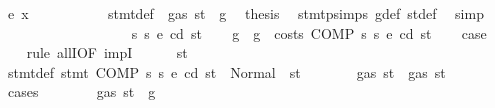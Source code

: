 \begin{isabellebody}
\ {\isacharparenleft}{\kern0pt}e\ x{\isacharparenright}{\kern0pt}\isanewline
\ \ \ \ \ \ \ \ \isamarkupfalse%
\ {}{\isacharparenleft}{\kern0pt}{}{\isacharparenright}{\kern0pt}\ stmt{\isacharunderscore}{\kern0pt}def\ {\isacharbackquoteopen}{\isasymnot}\ gas\ st\ {\isasymle}\ g{\isacharbackquoteclose}\ \isamarkupfalse%
\ {\isacharquery}{\kern0pt}thesis\ \isamarkupfalse%
\ stmt{\isachardot}{\kern0pt}psimps{\isacharparenleft}{\kern0pt}{}{\isacharparenright}{\kern0pt}\ g{\isacharunderscore}{\kern0pt}def\ st{\isacharprime}{\kern0pt}{\isacharunderscore}{\kern0pt}def\ \isamarkupfalse%
\ simp\isanewline
\ \ \ \ \ \ \isamarkupfalse%
\isanewline
\ \ \ \ \isamarkupfalse%
\isanewline
\ \ \isamarkupfalse%
\isanewline
{}\isamarkupfalse%
\isanewline
\ \ \isamarkupfalse%
\ {\isacharparenleft}{\kern0pt}{}\ s{}\ s{}\ e\ cd\ st{\isacharparenright}{\kern0pt}\isanewline
\ \ \isamarkupfalse%
\ g\ \ {\isachardoublequoteopen}g\ {\isacharequal}{\kern0pt}\ costs\ {\isacharparenleft}{\kern0pt}COMP\ s{}\ s{}{\isacharparenright}{\kern0pt}\ e\ cd\ st{\isachardoublequoteclose}\isanewline
\ \ \isamarkupfalse%
\ {\isacharquery}{\kern0pt}case\isanewline
\ \ \isamarkupfalse%
\ {\isacharparenleft}{\kern0pt}rule\ allI{\isacharbrackleft}{\kern0pt}OF\ impI{\isacharbrackright}{\kern0pt}{\isacharparenright}{\kern0pt}\isanewline
\ \ \ \ \isamarkupfalse%
\ st{}{\isacharprime}{\kern0pt}\isanewline
\ \ \ \ \isamarkupfalse%
\ stmt{\isacharunderscore}{\kern0pt}def{\isacharcolon}{\kern0pt}\ {\isachardoublequoteopen}stmt\ {\isacharparenleft}{\kern0pt}COMP\ s{}\ s{}{\isacharparenright}{\kern0pt}\ e\ cd\ st\ {\isacharequal}{\kern0pt}\ Normal\ {\isacharparenleft}{\kern0pt}{\isacharparenleft}{\kern0pt}{\isacharparenright}{\kern0pt}{\isacharcomma}{\kern0pt}\ st{}{\isacharprime}{\kern0pt}{\isacharparenright}{\kern0pt}{\isachardoublequoteclose}\isanewline
\ \ \ \ \isamarkupfalse%
\ \isamarkupfalse%
\ {\isachardoublequoteopen}gas\ st{}{\isacharprime}{\kern0pt}\ {\isasymle}\ gas\ st{\isachardoublequoteclose}\isanewline
\ \ \ \ \isamarkupfalse%
\ cases\isanewline
\ \ \ \ \ \ \isamarkupfalse%
\ {\isachardoublequoteopen}gas\ st\ {\isasymle}\ g{\isachardoublequoteclose}\isanewline

\end{isabellebody}
